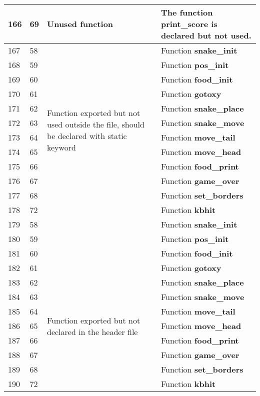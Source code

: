 \documentclass[]{article}
\begin{document}
\begin{longtable}{ |p{0.5cm}|p{0.75cm}|p{3cm}|p{9cm}|  }
 		\hline 
 		166 & 69 & Unused function & The function \textbf{print\_score} is declared but not used. \\
 		\hline 
 		167 & 58 & \multirow{12}{85.0pt}{Function exported but not used outside the file, should be declared with static keyword} & Function \textbf{snake\_init} \\
 		168 & 59 & & Function \textbf{pos\_init} \\
 		169 & 60 & & Function \textbf{food\_init}\\
 		170 & 61 & & Function \textbf{gotoxy}\\
 		171 & 62 & & Function \textbf{snake\_place}\\
 		172 & 63 & & Function \textbf{snake\_move}\\
 		173 & 64 & & Function \textbf{move\_tail}\\
 		174 & 65 & & Function \textbf{move\_head}\\
 		175 & 66 & & Function \textbf{food\_print} \\
 		176 & 67 & & Function \textbf{game\_over}\\
 		177 & 68 & & Function \textbf{set\_borders}\\
 		178 & 72 & & Function \textbf{kbhit}\\
 		\hline 
 		179 & 58 & & Function \textbf{snake\_init} \\
 		180 & 59 & & Function \textbf{pos\_init} \\
 		181 & 60 & & Function \textbf{food\_init}\\
 		182 & 61 & & Function \textbf{gotoxy}\\
 		183 & 62 &\multirow{7}{85.0pt}{Function exported but not declared in the header file} & Function \textbf{snake\_place}\\
 		184 & 63 & & Function \textbf{snake\_move}\\
 		185 & 64 & & Function \textbf{move\_tail}\\
 		186 & 65 & & Function \textbf{move\_head}\\
 		187 & 66 & & Function \textbf{food\_print} \\
 		188 & 67 & & Function \textbf{game\_over}\\
 		189 & 68 & & Function \textbf{set\_borders}\\
 		190 & 72 & & Function \textbf{kbhit}\\
 		\hline 
 	\end{longtable} 
\end{document}
